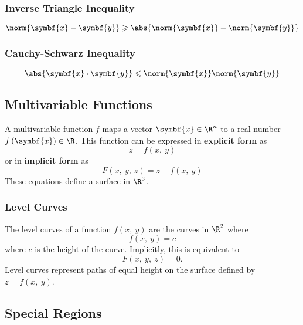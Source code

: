 \documentclass{article}
\begin{document}
\subsubsection{Inverse Triangle Inequality}
\begin{equation*}
    \norm{\symbf{x} - \symbf{y}} \geqslant \abs{\norm{\symbf{x}} - \norm{\symbf{y}}}
\end{equation*}
\subsubsection{Cauchy-Schwarz Inequality}
\begin{equation*}
    \abs{\symbf{x} \cdot \symbf{y}} \leqslant \norm{\symbf{x}} \norm{\symbf{y}}
\end{equation*}
\subsection{Multivariable Functions}
A multivariable function \(f\) maps a vector \(\symbf{x} \in \R^n\) to a real number \(f \left( \symbf{x} \right) \in \R\).
This function can be expressed in \textbf{explicit form} as
\begin{equation*}
    z = f\left( x,\: y \right)
\end{equation*}
or in \textbf{implicit form} as
\begin{equation*}
    F\left( x,\: y,\: z \right) = z - f\left( x,\: y \right)
\end{equation*}
These equations define a surface in \(\R^3\).
\subsubsection{Level Curves}
The level curves of a function \(f \left( x,\: y \right)\) are the curves in \(\R^2\) where
\begin{equation*}
    f \left( x,\: y \right) = c
\end{equation*}
where \(c\) is the height of the curve. Implicitly, this is equivalent to
\begin{equation*}
    F\left( x,\: y,\: z \right) = 0.
\end{equation*}
Level curves represent paths of equal height on the surface defined by \(z = f \left( x,\: y \right)\).
\subsection{Special Regions}
\end{document}
